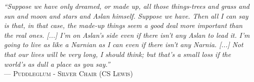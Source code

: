 \cleardoublepage %
\thispagestyle{empty} %

\vspace*{\fill}

\begin{flushright}
   \begin{minipage}{0.5\textwidth}
      \raggedleft %
      \textit{``Suppose we have only dreamed, or made up, all those things-trees and grass and sun and moon and stars and Aslan himself. Suppose we have. Then all I can say is that, in that case, the made-up things seem a good deal more important than the real ones. [...] I’m on Aslan’s side even if there isn’t any Aslan to lead it. I’m going to live as like a Narnian as I can even if there isn’t any Narnia. [...] Not that our lives will be very long, I should think; but that’s a small loss if the world’s as dull a place as you say.''} \\ %
      \vspace{0.5cm}
      --- \textsc{Puddleglum - Silver Chair (CS Lewis)} %
   \end{minipage}
\end{flushright}

\vspace*{4cm} 

\cleardoublepage %